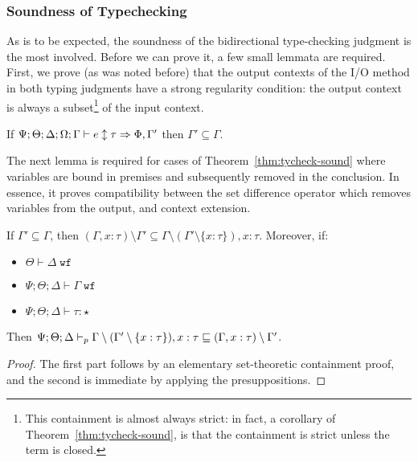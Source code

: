 \subsubsection{Soundness of Typechecking}

As is to be expected, the soundness of the bidirectional type-checking judgment is the most involved. Before we can prove it, a few small lemmata are required.
First, we prove (as was noted before) that the output contexts of the I/O method in both typing judgments have a strong regularity condition: the output context is always a subset\footnote{
This containment is almost always strict: in fact, a corollary of Theorem~\ref{thm:tycheck-sound}, is that the containment is strict unless the term is closed.
}
of the input context. 

\begin{theorem}
If $\Psi ; \Theta ; \Delta ; \Omega ; \Gamma \vdash e \updownarrow \tau \Rightarrow \Phi, \Gamma'$ then $\Gamma' \subseteq \Gamma$.
\label{thm:lsc}
\end{theorem}

The next lemma is required for cases of Theorem~\ref{thm:tycheck-sound} where variables are bound in premises and subsequently removed in the conclusion. In essence, it proves compatibility between the set difference operator which removes variables from the output, and context extension.

\begin{theorem}
If $\Gamma' \subseteq \Gamma$, then
$(\Gamma, x : \tau) \setminus \Gamma' \subseteq \Gamma \setminus (\Gamma' \setminus \{x : \tau\}), x : \tau$. Moreover, if:
~\begin{itemize}
  \item $\Theta \vdash \Delta \; \texttt{wf}$
  \item $\Psi ; \Theta ; \Delta \vdash \Gamma \; \texttt{wf}$
  \item $\Psi ; \Theta ; \Delta \vdash \tau : \star$
\end{itemize}
Then $\Psi ; \Theta ; \Delta \vdash_p \Gamma \setminus (\Gamma' \setminus \{x : \tau\}), x : \tau \sqsubseteq (\Gamma, x : \tau) \setminus \Gamma'$.
\label{thm:tycheck-sound-lemma}
\end{theorem}
\begin{proof}
The first part follows by an elementary set-theoretic containment proof, and the second is immediate by applying the presuppositions.
\end{proof}

